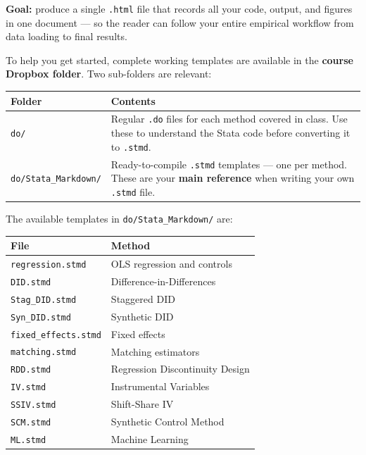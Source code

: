 \documentclass[paper=a4, fontsize=11pt]{scrartcl}
\begin{document}
\textbf{Goal:} produce a single \texttt{.html} file that records all your
code, output, and figures in one document --- so the reader can follow your
entire empirical workflow from data loading to final results.

\medskip
To help you get started, complete working templates are available in the
\textbf{course Dropbox folder}. Two sub-folders are relevant:

\medskip
\begin{center}
\begin{tabular}{p{4.2cm} p{9.8cm}}
\toprule
\textbf{Folder} & \textbf{Contents} \\
\midrule
\texttt{do/} &
Regular \texttt{.do} files for each method covered in class.
Use these to understand the Stata code before converting it to \texttt{.stmd}.\\[4pt]
\texttt{do/Stata\_Markdown/} &
Ready-to-compile \texttt{.stmd} templates --- one per method.
These are your \textbf{main reference} when writing your own \texttt{.stmd} file.\\
\bottomrule
\end{tabular}
\end{center}

\medskip
The available templates in \texttt{do/Stata\_Markdown/} are:

\medskip
\begin{center}
\begin{tabular}{ll}
\toprule
\textbf{File} & \textbf{Method} \\
\midrule
\texttt{regression.stmd}  & OLS regression and controls \\
\texttt{DID.stmd}         & Difference-in-Differences \\
\texttt{Stag\_DID.stmd}   & Staggered DID \\
\texttt{Syn\_DID.stmd}    & Synthetic DID \\
\texttt{fixed\_effects.stmd} & Fixed effects \\
\texttt{matching.stmd}    & Matching estimators \\
\texttt{RDD.stmd}         & Regression Discontinuity Design \\
\texttt{IV.stmd}          & Instrumental Variables \\
\texttt{SSIV.stmd}        & Shift-Share IV \\
\texttt{SCM.stmd}         & Synthetic Control Method \\
\texttt{ML.stmd}          & Machine Learning \\
\bottomrule
\end{tabular}
\end{center}
\end{document}
